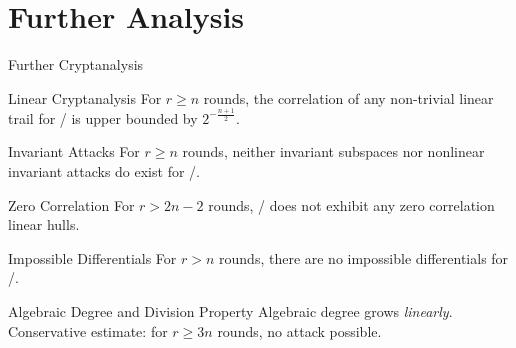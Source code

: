 \section{Further Analysis}
\begin{frame}{Further Cryptanalysis}
    \vspace*{-15pt}
    \begin{minipage}[t][70pt][t]{0.47\textwidth}
        \begin{block}{Linear Cryptanalysis\vpPp}
            For $r \geqslant n$ rounds, the correlation of any non-trivial linear trail for \bison/ is upper bounded by $2^{-\frac{n+1}{2}}$.
        \end{block}
    \end{minipage}
    \hfill
    \begin{minipage}[t][70pt][t]{0.47\textwidth}
        \begin{block}{Invariant Attacks\vpPp}
            For $r \geqslant n$ rounds, neither invariant subspaces nor nonlinear invariant attacks do exist for \bison/.
            \vspace{3pt}
        \end{block}
    \end{minipage}

    \begin{minipage}[t][70pt][t]{0.47\textwidth}
        \begin{block}{Zero Correlation\vpPp}
            For $r > 2n-2$ rounds, \bison/ does not exhibit any zero correlation linear hulls.
        \end{block}
    \end{minipage}
    \hfill
    \begin{minipage}[t][70pt][t]{0.47\textwidth}
        \begin{block}{Impossible Differentials\vpPp}
            For $r > n$ rounds, there are no impossible differentials for \bison/.
            \vspace{2pt}
        \end{block}
    \end{minipage}

    \vspace*{-12.5pt}
    \begin{minipage}[t][30pt][t]{0.985\textwidth}
        \begin{block}{Algebraic Degree and Division Property\vpPp}
            Algebraic degree grows \emph{linearly}.
            Conservative estimate: for $r \geqslant 3n$ rounds, no attack possible.
        \end{block}
    \end{minipage}


\end{frame}
